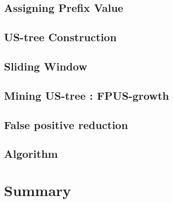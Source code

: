 \documentclass[a4paper,12pt]{book}
\begin{document}
\subsection{Assigning Prefix Value}

\subsection{US-tree Construction}

\subsection{Sliding Window}

\subsection{Mining US-tree : FPUS-growth}

\subsection{False positive reduction}

\subsection{Algorithm}

\section{Summary}

\end{document}
